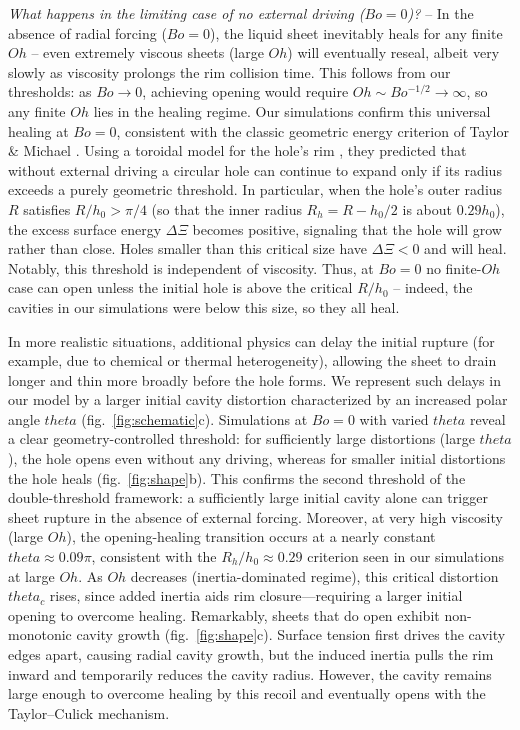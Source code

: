 \documentclass[reprint,amssymb,superscriptaddress,aps,prl,floatfix]{revtex4-2}
\def\theta{theta}%
\begin{document}
{\it What happens in the limiting case of no external driving ($Bo=0$)?} -- 
In the absence of radial forcing ($Bo=0$), the liquid sheet inevitably heals for any
finite $Oh$ -- even extremely viscous sheets (large $Oh$) will eventually reseal, albeit
very slowly as viscosity prolongs the rim collision time. 
This follows from our thresholds: as $Bo \to 0$, achieving opening would require $Oh \sim
Bo^{-1/2} \to \infty$, so any finite $Oh$ lies in the healing regime. Our simulations
confirm this universal healing at $Bo=0$, consistent with the classic geometric energy
criterion of Taylor \& Michael \cite{taylor1973making}. Using a toroidal model for the
hole's rim \cite{energyCriterion}\nocite{ilton2016direct, goudarzi2023hole,
moriarty1993dynamic, sharma1990energetic}, they predicted that without external driving a
circular hole can continue to expand only if its radius exceeds a purely geometric
threshold. 
In particular, when the hole's outer radius $R$ satisfies $R/h_0 > \pi/4$ (so that the
inner radius $R_h = R - h_0/2$ is about $0.29h_0$), the excess surface energy $\Delta \Xi$
becomes positive, signaling that the hole will grow rather than close. Holes smaller than
this critical size have $\Delta \Xi < 0$ and will heal. Notably, this threshold is
independent of viscosity. Thus, at $Bo=0$ no finite-$Oh$ case can open unless the initial
hole is above the critical $R/h_0$ -- indeed, the cavities in our simulations were
below this size, so they all heal.

In more realistic situations, additional physics can delay the initial rupture (for
example, due to chemical or thermal heterogeneity), allowing the sheet to drain longer and
thin more broadly before the hole forms. We represent such delays in our model by a larger
initial cavity distortion characterized by an increased polar angle $\theta$
(fig.~\ref{fig:schematic}c). 
Simulations at $Bo=0$ with varied $\theta$ reveal a clear geometry-controlled threshold: for
sufficiently large distortions (large $\theta$), the hole opens even without any driving,
whereas for smaller initial distortions the hole heals (fig.~\ref{fig:shape}b). 
This confirms the second threshold of the double-threshold framework: 
a sufficiently large initial cavity alone can trigger
sheet rupture in the absence of external forcing. Moreover, at very high viscosity (large
$Oh$), the opening-healing transition occurs at a nearly constant $\theta \approx
0.09\pi$, consistent with the $R_h/h_0 \approx 0.29$ criterion seen in our simulations at large $Oh$. As $Oh$ decreases
(inertia-dominated regime), this critical distortion $\theta_c$ rises, since
added inertia aids rim closure—requiring a larger initial opening to overcome healing. 
Remarkably, sheets that do open exhibit non-monotonic cavity growth (fig.~\ref{fig:shape}c). Surface tension first drives the cavity edges apart, causing radial cavity growth, but the induced inertia pulls the rim inward and temporarily reduces the cavity radius. However, the cavity remains large enough to overcome healing by this recoil and eventually opens with the Taylor--Culick mechanism.
\end{document}
